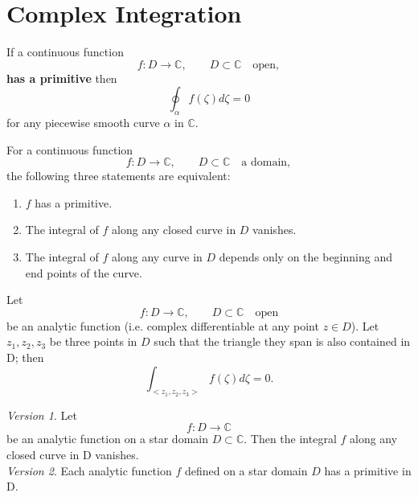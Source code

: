 \section{Complex Integration}


\begin{theorem}
    \label{sec:ClosedContourT}
    If a continuous function
    $$ f : D \rightarrow \mathbb{C}, \qquad D \subset \mathbb{C} \quad \text{open},$$
    \textbf{has a primitive} then
    $$\oint_\alpha f(\zeta)d\zeta = 0$$
    for any piecewise smooth curve $\alpha$ in $\mathbb{C}$.
\end{theorem}


\begin{theorem}
    \label{sec:MainTCalculus}
    For a continuous function
    $$ f : D \rightarrow \mathbb{C}, \qquad D \subset \mathbb{C} \quad \text{a domain},$$
    the following three statements are equivalent:
    \begin{enumerate}[label=\alph*)]
        \item $f$ has a primitive.
        \item The integral of $f$ along any closed curve in $D$ vanishes.
        \item The integral of $f$ along any curve in $D$ depends only on the beginning and end points of the curve.
    \end{enumerate}
\end{theorem}


\begin{theorem}
    \label{sec:CauchyITT}
    Let
    $$ f : D \rightarrow \mathbb{C}, \qquad D \subset \mathbb{C} \quad \text{open}$$
    be an analytic function (i.e. complex differentiable at any point $z \in D$). Let $z_1, z_2, z_3$ be three points
    in $D$ such that the triangle they span is also contained in D; then
    $$\int_{<z_1,z_2,z_3>} f(\zeta)d\zeta = 0.$$
\end{theorem}


\begin{theorem}
    \label{sec:CauchyITR}
    \textit{Version 1}. Let
    $$f : D \rightarrow \mathbb{C}$$
    be an analytic function on a star domain $D \subset \mathbb{C}$. Then the integral $f$ along
    any closed curve in D vanishes.\\
    \textit{Version 2}. Each analytic function $f$ defined on a star domain $D$ has a primitive in D.
\end{theorem}


